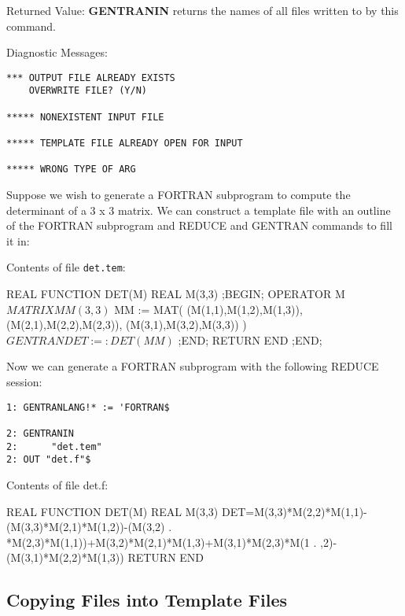 \begin{describe}{Returned Value:}
{\bf GENTRANIN} returns the names of all files written to by this
command.
\end{describe}
\begin{describe}{Diagnostic Messages:}
\begin{verbatim}
*** OUTPUT FILE ALREADY EXISTS
    OVERWRITE FILE? (Y/N)

***** NONEXISTENT INPUT FILE

***** TEMPLATE FILE ALREADY OPEN FOR INPUT

***** WRONG TYPE OF ARG
\end{verbatim}
\end{describe}
\begin{describe}{\example}
Suppose we wish to generate a FORTRAN subprogram to compute the
determinant of a 3 x 3 matrix.  We can construct a template
file with an outline of the FORTRAN subprogram and REDUCE and
GENTRAN commands to fill it in:

Contents of file {\tt det.tem}:
\end{describe}
\begin{framedverbatim}
      REAL FUNCTION DET(M)
      REAL M(3,3)
;BEGIN;
      OPERATOR M$
      MATRIX MM(3,3)$
      MM := MAT( (M(1,1),M(1,2),M(1,3)),
                 (M(2,1),M(2,2),M(2,3)),
                 (M(3,1),M(3,2),M(3,3)) )$
      GENTRAN DET :=: DET(MM)$
;END;
      RETURN
      END
;END;
\end{framedverbatim}

\begin{describe}{}
Now we can generate a FORTRAN subprogram with the following
REDUCE session:
\begin{verbatim}
1: GENTRANLANG!* := 'FORTRAN$

2: GENTRANIN
2:      "det.tem"
2: OUT "det.f"$
\end{verbatim}
Contents of file det.f:
\end{describe}
\begin{framedverbatim}
      REAL FUNCTION DET(M)
      REAL M(3,3)
      DET=M(3,3)*M(2,2)*M(1,1)-(M(3,3)*M(2,1)*M(1,2))-(M(3,2)
     . *M(2,3)*M(1,1))+M(3,2)*M(2,1)*M(1,3)+M(3,1)*M(2,3)*M(1
     . ,2)-(M(3,1)*M(2,2)*M(1,3))
      RETURN
      END
\end{framedverbatim}

\subsection{Copying Files into Template Files}
\label{copy:template}

